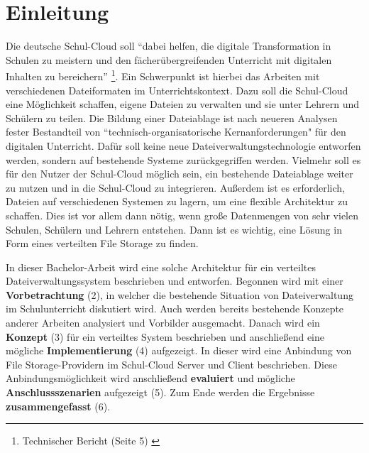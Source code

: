 \section{Einleitung}
\label{sec:intro}

Die deutsche Schul-Cloud soll ``dabei helfen, die digitale Transformation in Schulen zu meistern und den fächerübergreifenden Unterricht mit digitalen Inhalten zu bereichern'' \footnote{ Technischer Bericht (Seite 5) \cite{paper:technischerbericht}}. Ein Schwerpunkt ist hierbei das Arbeiten mit verschiedenen Dateiformaten im Unterrichtskontext. Dazu soll die Schul-Cloud eine Möglichkeit schaffen, eigene Dateien zu verwalten und sie unter Lehrern und Schülern zu teilen. Die Bildung einer Dateiablage ist nach neueren Analysen fester Bestandteil von ``technisch-organisatorische Kernanforderungen" \cite{paper:breiterstolpmannzeising2015} für den digitalen Unterricht. Dafür soll keine neue Dateiverwaltungstechnologie entworfen werden, sondern auf bestehende Systeme zurückgegriffen werden. Vielmehr soll es für den Nutzer der Schul-Cloud möglich sein, ein bestehende Dateiablage weiter zu nutzen und in die Schul-Cloud zu integrieren. Außerdem ist es erforderlich, Dateien auf verschiedenen Systemen zu lagern, um eine flexible Architektur zu schaffen. Dies ist vor allem dann nötig, wenn große Datenmengen von sehr vielen Schulen, Schülern und Lehrern entstehen. Dann ist es wichtig, eine Lösung in Form eines verteilten File Storage zu finden. 

In dieser Bachelor-Arbeit wird eine solche Architektur für ein verteiltes Dateiverwaltungssystem beschrieben und entworfen. Begonnen wird mit einer \textbf{Vorbetrachtung} (2), in welcher die bestehende Situation von Dateiverwaltung im Schulunterricht diskutiert wird. Auch werden bereits bestehende Konzepte anderer Arbeiten analysiert und Vorbilder ausgemacht. Danach wird ein \textbf{Konzept} (3) für ein verteiltes System beschrieben und anschließend eine mögliche \textbf{Implementierung} (4)  aufgezeigt. In dieser wird eine Anbindung von File Storage-Providern im Schul-Cloud Server und Client beschrieben. Diese Anbindungsmöglichkeit wird anschließend \textbf{evaluiert} und mögliche \textbf{Anschlussszenarien} aufgezeigt (5). Zum Ende werden die Ergebnisse \textbf{zusammengefasst} (6).

\clearpage
